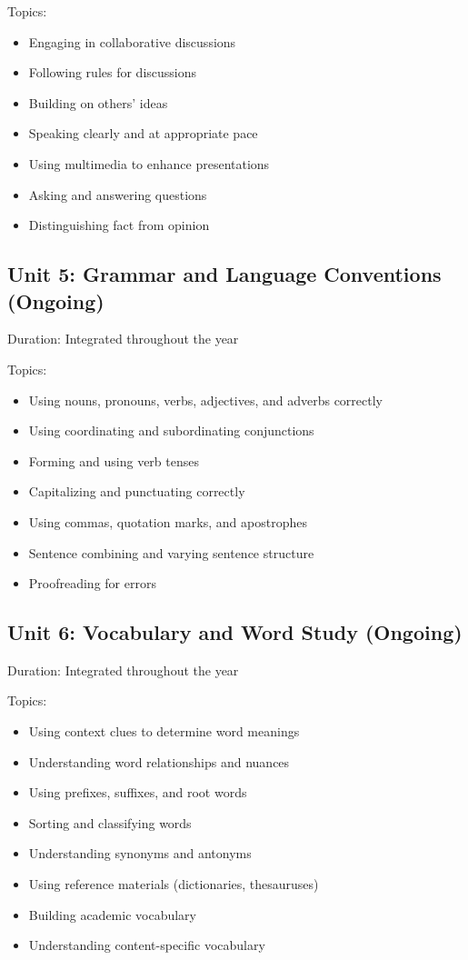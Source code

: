 \documentclass[11pt,letterpaper]{report}
\begin{document}
Topics:
\begin{itemize}
\item Engaging in collaborative discussions
\item Following rules for discussions
\item Building on others' ideas
\item Speaking clearly and at appropriate pace
\item Using multimedia to enhance presentations
\item Asking and answering questions
\item Distinguishing fact from opinion
\end{itemize}

\subsection{Unit 5: Grammar and Language Conventions (Ongoing)}

Duration: Integrated throughout the year

Topics:
\begin{itemize}
\item Using nouns, pronouns, verbs, adjectives, and adverbs correctly
\item Using coordinating and subordinating conjunctions
\item Forming and using verb tenses
\item Capitalizing and punctuating correctly
\item Using commas, quotation marks, and apostrophes
\item Sentence combining and varying sentence structure
\item Proofreading for errors
\end{itemize}

\subsection{Unit 6: Vocabulary and Word Study (Ongoing)}

Duration: Integrated throughout the year

Topics:
\begin{itemize}
\item Using context clues to determine word meanings
\item Understanding word relationships and nuances
\item Using prefixes, suffixes, and root words
\item Sorting and classifying words
\item Understanding synonyms and antonyms
\item Using reference materials (dictionaries, thesauruses)
\item Building academic vocabulary
\item Understanding content-specific vocabulary
\end{itemize}
\end{document}
